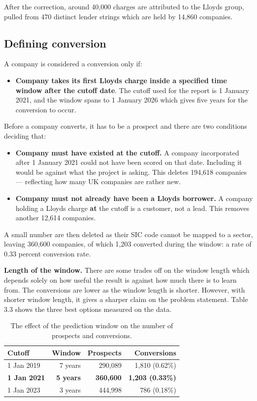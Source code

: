 \documentclass[ %
                    author={Natchalin Iwsakul \\[0.4em] Inkaphol Siriwongwattana \\[0.4em] Tanaphan Kummaraphat \\[0.6em] Patorn Srisupap},,
                supervisor={Fernando Moreno-Pino},
                    degree={MSc},
                     title={Propensity Modelling for SME Commercial Lending Using Open Public Data
},
                  subtitle={Companies House and GDELT as predictors of first-time borrowing},
                      type={},
                      year={2026}]{dissertation}
\begin{document}
  After the correction, around 40,000 charges are attributed to the Lloyds group, pulled from 470 distinct lender strings which are held by 14,860 companies.
  
  \subsection{Defining conversion}
    A company is considered a conversion only if:

\begin{itemize}
    \item \textbf{Company takes its first Lloyds charge inside a specified time window after the cutoff date}. The cutoff used for the report is 1 January 2021, and the window spans to 1 January 2026 which gives five years for the conversion to occur.
\end{itemize}

Before a company converts, it has to be a prospect and there are two conditions deciding that:

\begin{itemize}
  \item \textbf{Company must have existed at the cutoff.} A company incorporated after
        1 January 2021 could not have been scored on that date. Including it would be against what the project is asking. This deletes 194,618 companies --- 
        reflecting how many UK companies are rather new.

  \item \textbf{Company must not already have been a Lloyds borrower.} A company holding
        a Lloyds charge \textbf{at} the cutoff is a customer, not a lead. This removes another 12,614 companies.
\end{itemize}

A small number are then deleted as their SIC code cannot be mapped to a sector, leaving 360,600 companies, of which 1,203 converted during the window: a rate of 0.33 percent conversion rate.

\textbf{Length of the window.} There are some trades off on the window length which depends solely on how useful the result is against how much there is to learn from. The conversions are lower as the window length is shorter. However, with shorter window length, it gives a sharper claim on the problem statement. Table 3.3 shows the three best options measured on the data. 

\begin{table}[H]
\centering
\begin{tabular}{lrrr}
\toprule
Cutoff & Window & Prospects & Conversions \\
\midrule
1 Jan 2019          & 7 years          & 290,089          & 1,810 (0.62\%) \\
\textbf{1 Jan 2021} & \textbf{5 years} & \textbf{360,600} & \textbf{1,203 (0.33\%)} \\
1 Jan 2023          & 3 years          & 444,998          &   786 (0.18\%) \\
\bottomrule
\end{tabular}
\caption[Prediction window options]{The effect of the prediction window on the
number of prospects and conversions.}
\label{tab:windows}
\end{table}
\end{document}
